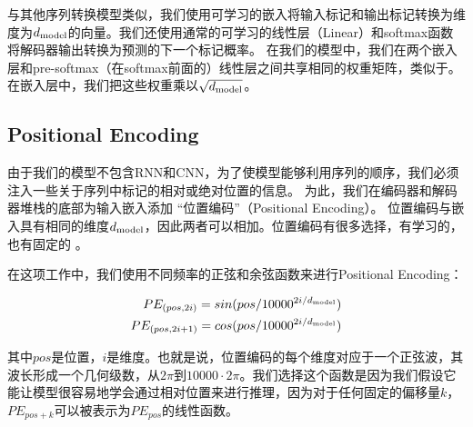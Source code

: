 与其他序列转换模型类似，我们使用可学习的嵌入将输入标记和输出标记转换为维度为$d_{\text{model}}$的向量。我们还使用通常的可学习的线性层（Linear）和softmax函数将解码器输出转换为预测的下一个标记概率。 在我们的模型中，我们在两个嵌入层和pre-softmax（在softmax前面的）线性层之间共享相同的权重矩阵，类似于\citep{press2016using}。在嵌入层中，我们把这些权重乘以$\sqrt{d_{\text{model}}}$。

\subsection{Positional Encoding}
由于我们的模型不包含RNN和CNN，为了使模型能够利用序列的顺序，我们必须注入一些关于序列中标记的相对或绝对位置的信息。 为此，我们在编码器和解码器堆栈的底部为输入嵌入添加 “位置编码”（Positional Encoding）。 位置编码与嵌入具有相同的维度$d_{\text{model}}$，因此两者可以相加。位置编码有很多选择，有学习的，也有固定的 \citep{JonasFaceNet2017}。


在这项工作中，我们使用不同频率的正弦和余弦函数来进行Positional Encoding：

\begin{align*}
    PE_{(pos,2i)} = sin(pos / 10000^{2i/d_{\text{model}}}) \\
    PE_{(pos,2i+1)} = cos(pos / 10000^{2i/d_{\text{model}}})
\end{align*}


其中$pos$是位置，$i$是维度。也就是说，位置编码的每个维度对应于一个正弦波，其波长形成一个几何级数，从$2\pi$到$10000\cdot 2\pi$。我们选择这个函数是因为我们假设它能让模型很容易地学会通过相对位置来进行推理，因为对于任何固定的偏移量$k$，$PE_{pos+k}$可以被表示为$PE_{pos}$的线性函数。

